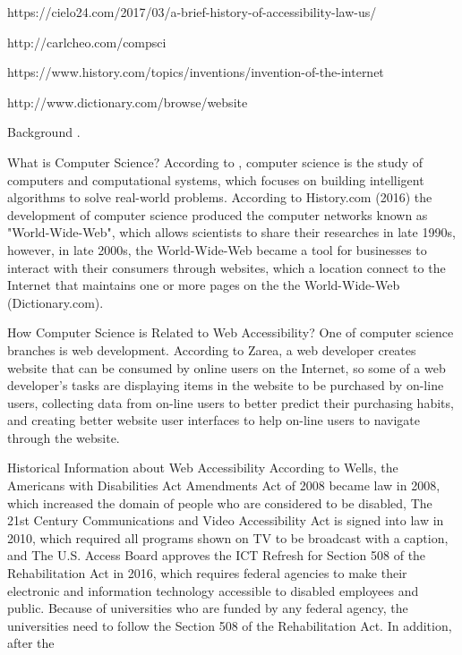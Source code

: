 \documentclass[11pt, titlepage]{article}
\newenvironment{index_me} {
	\begin{adjustwidth}{2cm}{}
}{\end{adjustwidth}}
\newenvironment{doc_heading}[1]
{
     \section*{\sffamily \LARGE \capitalisewords{#1}}
}{}
\newenvironment{doc_subheading}[1]
{
	\begin{index_me}
    \subsection*{\sffamily\Large \capitalisewords{#1}}
}{\end{index_me}}
\begin{document}
https://cielo24.com/2017/03/a-brief-history-of-accessibility-law-us/

 http://carlcheo.com/compsci

 https://www.history.com/topics/inventions/invention-of-the-internet

 http://www.dictionary.com/browse/website
\fi


\begin{doc_heading}{Background}
\color{white}.\vspace{-0.5in}\color{black}
  \begin{doc_subheading}{What is Computer Science?}
  	According to , computer science is the study of computers and computational systems, which focuses on building intelligent algorithms to solve real-world problems. According to History.com (2016) the development of computer science produced the computer networks known as "World-Wide-Web", which allows scientists to share their researches in late 1990s, however, in late 2000s, the World-Wide-Web became a tool for businesses to interact with their consumers through websites, which a location connect to the Internet that maintains one or more pages on the the World-Wide-Web (Dictionary.com).
  \end{doc_subheading}
  \begin{doc_subheading}{How Computer Science is Related to Web Accessibility?}
  	One of computer science branches is web development. According to Zarea, a web developer creates website that can be consumed by online users on the Internet, so some of a web developer's tasks are displaying items in the website to be purchased by on-line users, collecting data from on-line users to better predict their purchasing habits, and creating better website user interfaces to help on-line users to navigate through the website.
  \end{doc_subheading}
  \begin{doc_subheading}{Historical Information about Web Accessibility}
  	According to Wells, the Americans with Disabilities Act Amendments Act of 2008 became law in 2008, which increased the domain of people who are considered to be disabled, The 21st Century Communications and Video Accessibility Act is signed into law in 2010, which required all programs shown on TV to be broadcast with a caption, and The U.S. Access Board approves the ICT Refresh for Section 508 of the Rehabilitation Act in 2016, which requires federal agencies to make their electronic and information technology accessible to disabled employees and public. Because of universities who are funded by any federal agency, the universities need to follow the Section 508 of the Rehabilitation Act. In addition, after the
  \end{doc_subheading}
\end{doc_heading}
\end{document}
